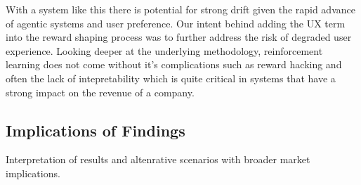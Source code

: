 With a system like this there is potential for strong drift given the rapid advance of agentic systems and user preference. Our intent behind adding the UX term into the reward shaping process was to further address the risk of degraded user experience. Looking deeper at the underlying methodology, reinforcement learning does not come without it's complications such as reward hacking and often the lack of intepretability which is quite critical in systems that have a strong impact on the revenue of a company.

\subsection{Implications of Findings}

Interpretation of results and altenrative scenarios with broader market implications.

